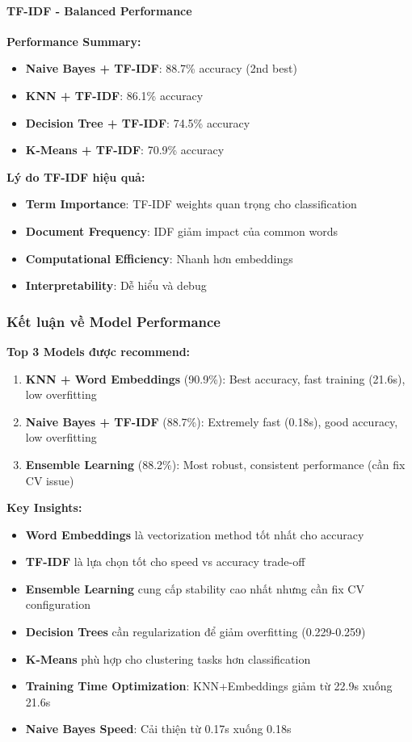 \paragraph{TF-IDF - Balanced Performance}

\textbf{Performance Summary:}
\begin{itemize}
    \item \textbf{Naive Bayes + TF-IDF}: 88.7\% accuracy (2nd best)
    \item \textbf{KNN + TF-IDF}: 86.1\% accuracy
    \item \textbf{Decision Tree + TF-IDF}: 74.5\% accuracy
    \item \textbf{K-Means + TF-IDF}: 70.9\% accuracy
\end{itemize}

\textbf{Lý do TF-IDF hiệu quả:}
\begin{itemize}
    \item \textbf{Term Importance}: TF-IDF weights quan trọng cho classification
    \item \textbf{Document Frequency}: IDF giảm impact của common words
    \item \textbf{Computational Efficiency}: Nhanh hơn embeddings
    \item \textbf{Interpretability}: Dễ hiểu và debug
\end{itemize}

\subsubsection{Kết luận về Model Performance}

\textbf{Top 3 Models được recommend:}
\begin{enumerate}
    \item \textbf{KNN + Word Embeddings} (90.9\%): Best accuracy, fast training (21.6s), low overfitting
    \item \textbf{Naive Bayes + TF-IDF} (88.7\%): Extremely fast (0.18s), good accuracy, low overfitting  
    \item \textbf{Ensemble Learning} (88.2\%): Most robust, consistent performance (cần fix CV issue)
\end{enumerate}

\textbf{Key Insights:}
\begin{itemize}
    \item \textbf{Word Embeddings} là vectorization method tốt nhất cho accuracy
    \item \textbf{TF-IDF} là lựa chọn tốt cho speed vs accuracy trade-off
    \item \textbf{Ensemble Learning} cung cấp stability cao nhất nhưng cần fix CV configuration
    \item \textbf{Decision Trees} cần regularization để giảm overfitting (0.229-0.259)
    \item \textbf{K-Means} phù hợp cho clustering tasks hơn classification
    \item \textbf{Training Time Optimization}: KNN+Embeddings giảm từ 22.9s xuống 21.6s
    \item \textbf{Naive Bayes Speed}: Cải thiện từ 0.17s xuống 0.18s
\end{itemize}

